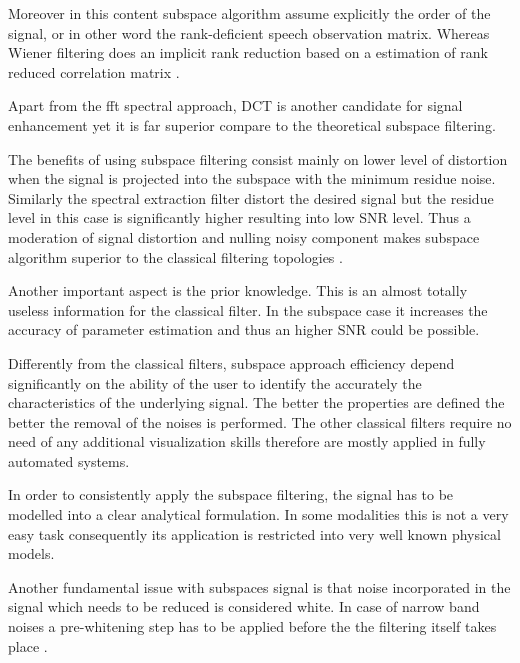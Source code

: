 Moreover in this content subspace algorithm assume explicitly the order of the signal, or in other word the rank-deficient speech observation matrix. Whereas Wiener filtering does an implicit rank reduction based on a estimation of rank reduced correlation matrix \cite{2}.

Apart from the fft spectral approach, DCT is another candidate for signal enhancement yet it is far superior compare to the theoretical subspace filtering\cite{2}.

The benefits of using subspace filtering consist mainly on lower level of distortion when the signal is projected into the subspace with the minimum residue noise. Similarly the spectral extraction filter distort the desired signal but the residue level in this case is significantly higher resulting into low SNR level. Thus a moderation of signal distortion and nulling noisy component makes subspace algorithm superior to the classical filtering topologies \cite{3}.  

Another important aspect is the prior knowledge. This is an almost totally useless information for the classical filter. In the subspace case it increases the accuracy of parameter estimation and thus an higher SNR could be possible\cite{3}.

Differently from the classical filters, subspace approach efficiency depend significantly on the ability of the user to identify the accurately the characteristics of the underlying signal. The better the properties are defined the better the removal of the noises is performed\cite{5}. The other classical filters require no need of any additional visualization skills therefore are mostly applied in fully automated systems.

In order to consistently apply the subspace filtering, the signal has to be modelled into a clear analytical formulation. In some modalities this is not a very easy task consequently its application is restricted into very well known physical models.

Another fundamental issue with subspaces signal is that noise incorporated in the signal which needs to be reduced is considered white. In case of narrow band noises a pre-whitening step has to be applied before the the filtering itself takes place \cite{6}.


